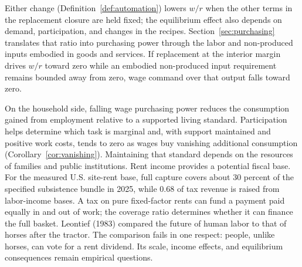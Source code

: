 \documentclass[12pt]{article}
\theoremstyle{plain}
\theoremstyle{definition}
\theoremstyle{remark}
\begin{document}
Either change (Definition~\ref{def:automation}) lowers $w/r$ when the other terms in the replacement closure are held fixed; the equilibrium effect also depends on demand, participation, and changes in the recipes. Section~\ref{sec:purchasing} translates that ratio into purchasing power through the labor and non-produced inputs embodied in goods and services. If replacement at the interior margin drives $w/r$ toward zero while an embodied non-produced input requirement remains bounded away from zero, wage command over that output falls toward zero.

On the household side, falling wage purchasing power reduces the consumption gained from employment relative to a supported living standard. Participation helps determine which task is marginal and, with support maintained and positive work costs, tends to zero as wages buy vanishing additional consumption (Corollary~\ref{cor:vanishing}). Maintaining that standard depends on the resources of families and public institutions. Rent income provides a potential fiscal base. For the measured U.S. site-rent base, full capture covers about 30 percent of the specified subsistence bundle in 2025, while 0.68 of tax revenue is raised from labor-income bases. A tax on pure fixed-factor rents can fund a payment paid equally in and out of work; the coverage ratio determines whether it can finance the full basket.
Leontief (1983) compared the future of human labor to that of horses after the tractor. The comparison fails in one respect: people, unlike horses, can vote for a rent dividend.
Its scale, income effects, and equilibrium consequences remain empirical questions.
\end{document}

